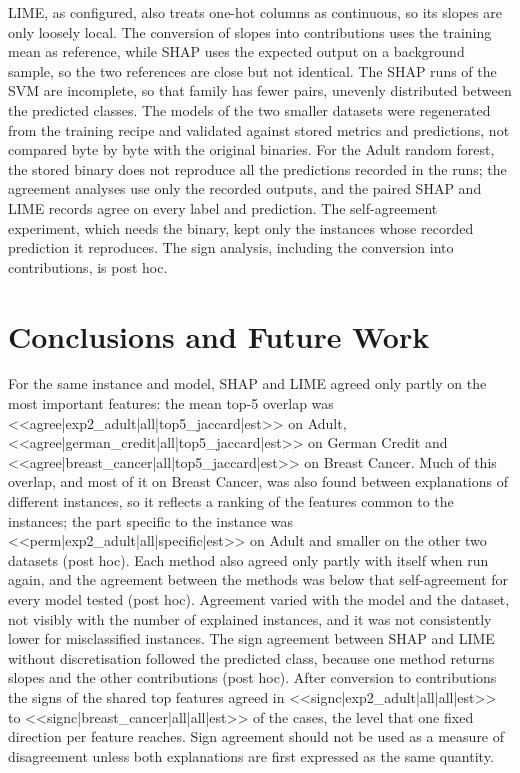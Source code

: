 \documentclass{cys}
\begin{document}
LIME, as configured, also treats one-hot columns as continuous, so its slopes are only
loosely local. The conversion of slopes into contributions uses the training mean as reference,
while SHAP uses the expected output on a background sample, so the two references are
close but not identical. The SHAP runs of the SVM are incomplete, so that family has fewer pairs, unevenly
distributed between the predicted classes. The models of the two smaller datasets were regenerated from the training recipe
and validated against stored metrics and predictions, not compared byte by byte with the
original binaries. For the Adult random forest, the stored binary does not reproduce all
the predictions recorded in the runs; the agreement analyses use only the recorded
outputs, and the paired SHAP and LIME records agree on every label and prediction. The
self-agreement experiment, which needs the binary, kept only the instances whose recorded
prediction it reproduces. The sign analysis,
including the conversion into contributions, is post hoc.

\section{Conclusions and Future Work}
\label{sec:conclusions}

For the same instance and model, SHAP and LIME agreed only partly on the most important
features: the mean top-5 overlap was <<agree|exp2_adult|all|top5_jaccard|est>> on Adult,
<<agree|german_credit|all|top5_jaccard|est>> on German Credit and
<<agree|breast_cancer|all|top5_jaccard|est>> on Breast Cancer. Much of this overlap, and
most of it on Breast Cancer, was also found between explanations of different instances,
so it reflects a ranking of the features common to the instances; the part specific to
the instance was <<perm|exp2_adult|all|specific|est>> on Adult and smaller on the other two
datasets (post hoc). Each method also agreed only
partly with itself when run again, and the agreement between the methods was below that
self-agreement for every model tested (post hoc). Agreement varied with the model and the
dataset, not visibly with the number of explained instances, and it was not consistently
lower for misclassified instances. The sign agreement between SHAP and LIME without
discretisation followed the predicted class, because one method returns slopes and the
other contributions (post hoc). After conversion to contributions the signs of the shared
top features agreed in <<signc|exp2_adult|all|all|est>> to
<<signc|breast_cancer|all|all|est>> of the cases, the level that one fixed direction per
feature reaches. Sign agreement should not be used as a measure of disagreement unless
both explanations are first expressed as the same quantity.
\end{document}
